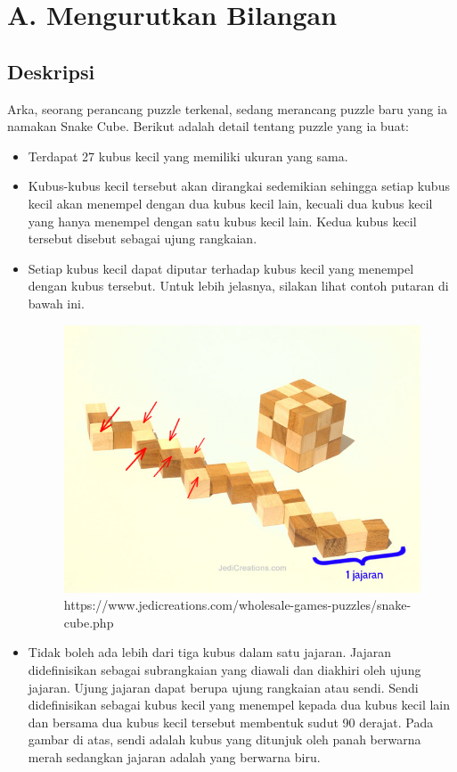 \documentclass{article}
\begin{document}
\section*{\hfil A. Mengurutkan Bilangan\hfil}

\subsection*{Deskripsi}

\par\noindent Arka, seorang perancang puzzle terkenal, sedang merancang puzzle baru yang ia namakan Snake Cube. Berikut adalah detail tentang puzzle yang ia buat:

\begin{itemize}
	\item Terdapat 27 kubus kecil yang memiliki ukuran yang sama.
	\item Kubus-kubus kecil tersebut akan dirangkai sedemikian sehingga setiap kubus kecil akan menempel dengan dua kubus kecil lain, kecuali dua kubus kecil yang hanya menempel dengan satu kubus kecil lain. Kedua kubus kecil tersebut disebut sebagai ujung rangkaian.
	\item Setiap kubus kecil dapat diputar terhadap kubus kecil yang menempel dengan kubus tersebut. Untuk lebih jelasnya, silakan lihat contoh putaran di bawah ini.

	\begin{figure}[h!]
		\centering
		\includegraphics[width=0.5\linewidth]{contoh-1.jpg}
		\caption{https://www.jedicreations.com/wholesale-games-puzzles/snake-cube.php}
	\end{figure}

	\item Tidak boleh ada lebih dari tiga kubus dalam satu jajaran. Jajaran didefinisikan sebagai subrangkaian yang diawali dan diakhiri oleh ujung jajaran. Ujung jajaran dapat berupa ujung rangkaian atau sendi. Sendi didefinisikan sebagai kubus kecil yang menempel kepada dua kubus kecil lain dan bersama dua kubus kecil tersebut membentuk sudut 90 derajat. Pada gambar di atas, sendi adalah kubus yang ditunjuk oleh panah berwarna merah sedangkan jajaran adalah yang berwarna biru.

\end{itemize}
\end{document}
